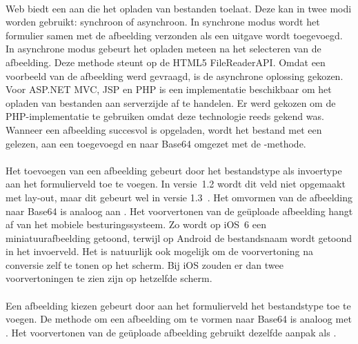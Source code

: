 \paragraph{\kendo}
\kendo{} Web biedt een  aan die het opladen van bestanden toelaat.
Deze  kan in twee modi worden gebruikt: synchroon of asynchroon.
In synchrone modus wordt het formulier samen met de afbeelding verzonden als een uitgave wordt toegevoegd.
In asynchrone modus gebeurt het opladen meteen na het selecteren van de afbeelding.
Deze methode steunt op de HTML5 FileReaderAPI.
Omdat een voorbeeld van de afbeelding werd gevraagd, is de asynchrone oplossing gekozen.	
Voor ASP.NET MVC,  JSP en PHP is een implementatie beschikbaar om het opladen van bestanden aan serverzijde af te handelen.
Er werd gekozen om de PHP-implementatie te gebruiken omdat deze technologie reeds gekend was.
Wanneer een afbeelding succesvol is opgeladen, wordt het bestand met een  gelezen,  aan een  toegevoegd en naar Base64 omgezet met de -methode.

\paragraph{\jqm}
Het toevoegen van een afbeelding gebeurt door het bestandstype als invoertype aan het formulierveld toe te voegen. 
In versie~1.2 wordt dit veld niet opgemaakt met lay-out, maar dit gebeurt wel in versie 1.3~\cite{JQuery2013d}. 
Het omvormen van de afbeelding naar Base64 is analoog aan \kendo{}.
Het voorvertonen van de geüploade afbeelding hangt af van het mobiele besturingssysteem.
Zo wordt op iOS~6 een miniatuurafbeelding getoond, terwijl op Android de bestandsnaam wordt getoond in het invoerveld.
Het is natuurlijk ook mogelijk om de voorvertoning na conversie zelf te tonen op het scherm.
Bij iOS zouden er dan twee voorvertoningen te zien zijn op hetzelfde scherm.

\paragraph{\lungo}
Een afbeelding kiezen gebeurt door aan het formulierveld het bestandstype toe te voegen.
De methode om een afbeelding om te vormen naar Base64 is analoog met \kendo{}.
Het voorvertonen van de geüploade afbeelding gebruikt dezelfde aanpak als \jqm{}.


\subsection{}
\label{sec:evaluatie-gebruik-validatie}

